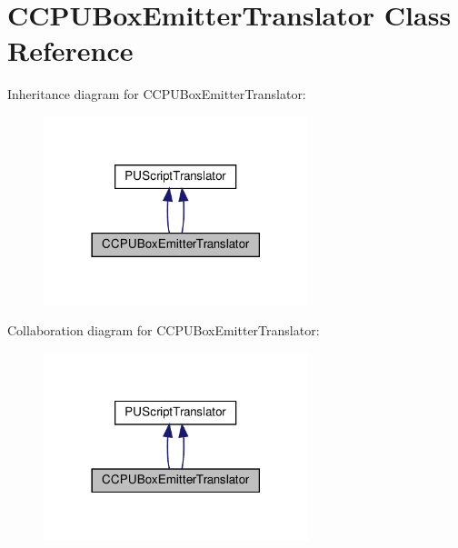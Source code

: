 \hypertarget{classCCPUBoxEmitterTranslator}{}\section{C\+C\+P\+U\+Box\+Emitter\+Translator Class Reference}
\label{classCCPUBoxEmitterTranslator}


Inheritance diagram for C\+C\+P\+U\+Box\+Emitter\+Translator\+:
\nopagebreak
\begin{figure}[H]
\begin{center}
\leavevmode
\includegraphics[width=218pt]{classCCPUBoxEmitterTranslator__inherit__graph}
\end{center}
\end{figure}


Collaboration diagram for C\+C\+P\+U\+Box\+Emitter\+Translator\+:
\nopagebreak
\begin{figure}[H]
\begin{center}
\leavevmode
\includegraphics[width=218pt]{classCCPUBoxEmitterTranslator__coll__graph}
\end{center}
\end{figure}
